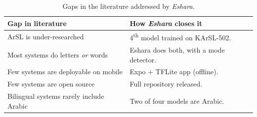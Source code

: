 \begin{table}[H]\centering
  \caption{Gaps in the literature addressed by \emph{Eshara}.}\label{tab:gap}
  \begin{tabularx}{\textwidth}{X X}\toprule
    Gap in literature & How \emph{Eshara} closes it \\\midrule
    ArSL is under-researched & 4\textsuperscript{th} model trained on KArSL-502. \\
    Most systems do letters \emph{or} words & Eshara does both, with a mode detector. \\
    Few systems are deployable on mobile & Expo + TFLite app (offline). \\
    Few systems are open source & Full repository released. \\
    Bilingual systems rarely include Arabic & Two of four models are Arabic. \\\bottomrule
  \end{tabularx}
\end{table}
